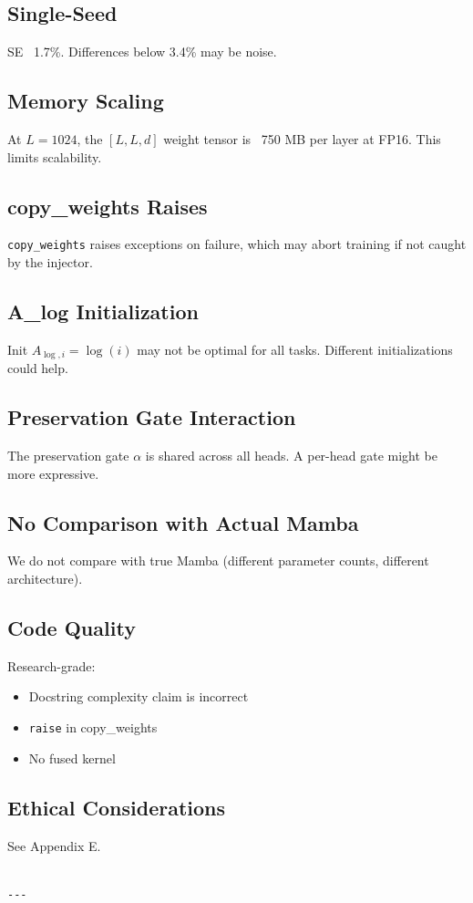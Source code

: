 \subsection{Single-Seed}

SE ~1.7\%. Differences below 3.4\% may be noise.

\subsection{Memory Scaling}

At $L = 1024$, the $[L, L, d]$ weight tensor is ~750 MB per layer at FP16. 
This limits scalability.

\subsection{copy\_weights Raises}

\texttt{copy\_weights} raises exceptions on failure, which may abort training if 
not caught by the injector.

\subsection{A\_log Initialization}

Init $A_{\log, i} = \log(i)$ may not be optimal for all tasks. Different 
initializations could help.

\subsection{Preservation Gate Interaction}

The preservation gate $\alpha$ is shared across all heads. A per-head gate 
might be more expressive.

\subsection{No Comparison with Actual Mamba}

We do not compare with true Mamba (different parameter counts, different 
architecture).

\subsection{Code Quality}

Research-grade:
\begin{itemize}
\item Docstring complexity claim is incorrect
\item \texttt{raise} in copy\_weights
\item No fused kernel

\end{itemize}
\subsection{Ethical Considerations}

See Appendix E.
\begin{lstlisting}

---
\end{lstlisting}